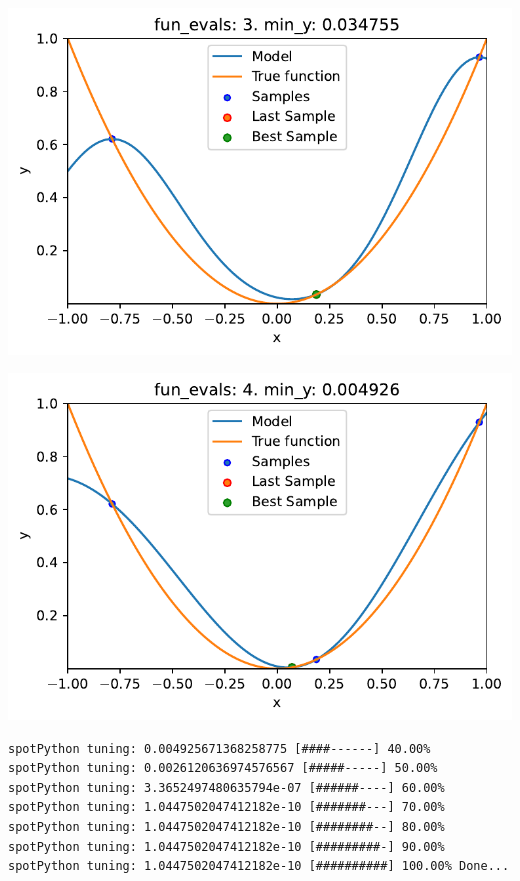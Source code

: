 \documentclass[
  letterpaper,
  DIV=11,
  numbers=noendperiod]{scrreprt}
\begin{document}
\includegraphics{010_num_spot_sklearn_surrogate_files/figure-pdf/cell-24-output-1.pdf}

\includegraphics{010_num_spot_sklearn_surrogate_files/figure-pdf/cell-24-output-2.pdf}

\begin{verbatim}
spotPython tuning: 0.004925671368258775 [####------] 40.00% 
spotPython tuning: 0.0026120636974576567 [#####-----] 50.00% 
spotPython tuning: 3.3652497480635794e-07 [######----] 60.00% 
spotPython tuning: 1.0447502047412182e-10 [#######---] 70.00% 
spotPython tuning: 1.0447502047412182e-10 [########--] 80.00% 
spotPython tuning: 1.0447502047412182e-10 [#########-] 90.00% 
spotPython tuning: 1.0447502047412182e-10 [##########] 100.00% Done...
\end{verbatim}
\end{document}
